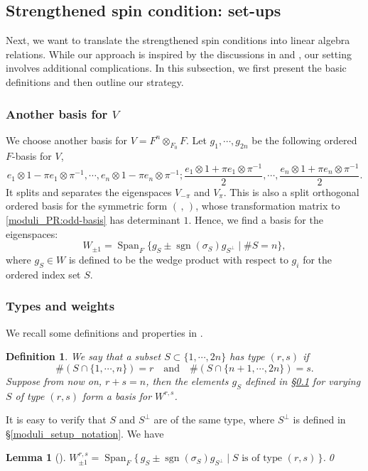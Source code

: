 \documentclass[pdflatex,sn-mathphys-num]{sn-jnl}%
\theoremstyle{thmstyleone}%
\newtheorem{lemma}[subsubsection]{Lemma}%
\theoremstyle{thmstyletwo}%
\numberwithin{equation}{subsection}
\theoremstyle{thmstylethree}%
\newtheorem{definition}[subsubsection]{Definition}%
\DeclareMathOperator{\sgn}{sgn}
\DeclareMathOperator{\Span}{Span}
\begin{document}
\subsection{Strengthened spin condition: set-ups}\label{equ_ss-setup}	
Next, we want to translate the strengthened spin conditions into linear algebra relations. 
While our approach is inspired by the discussions in \cite[\S 4.1]{Smithling2015} and \cite[\S 1.4.2]{Yu2019}, our setting involves additional complications. In this subsection, we first present the basic definitions and then outline our strategy.
		
\subsubsection{Another basis for $V$}
We choose another basis for $V=F^n\otimes_{F_0}F$. Let $g_1,\cdots,g_{2n}$ be the following ordered $F$-basis for $V$,
\begin{equation}
	e_1\otimes 1-\pi e_1\otimes \pi^{-1},\cdots,e_n\otimes 1-\pi e_n\otimes \pi^{-1};\frac{e_1\otimes 1+\pi e_1\otimes \pi^{-1}}{2},\cdots,\frac{e_n\otimes 1+\pi e_n\otimes \pi^{-1}}{2}.	
\end{equation}
It splits and separates the eigenspaces $V_{-\pi}$ and $V_\pi$.
This is also a split orthogonal ordered basis for the symmetric form $(\,,\,)$, whose transformation matrix to \eqref{moduli_PR:odd-basis} has determinant $1$. 
Hence, we find a basis for the eigenspaces:
\begin{equation*}\label{equ_ss-setup:decomp}
	W_{\pm 1}=
	\Span_F\{g_S\pm \sgn(\sigma_S)g_{S^\perp}\mid \#S=n\},
\end{equation*}
where $g_S\in W$ is defined to be the wedge product with respect to $g_i$ for the ordered index set $S$.  
		
		
		
		
\subsubsection{Types and weights}
We recall some definitions and properties in \cite[\S 4.2, \S 4.3]{Smithling2015}.
		
\begin{definition} 
We say that a subset $S \subset \{1,\cdots,2n\}$ has \emph{type $(r,s)$} if
\[
\#(S\cap \{1,\cdots,n\}) = r
\quad\text{and}\quad
\#(S\cap\{n+1,\cdots,2n\}) = s.
\]
Suppose from now on, $r + s = n$, then the elements $g_S$ defined in \S \ref{equ_ss-setup} for varying $S$ of type $(r,s)$ form a basis for $W^{r,s}$.
\end{definition}
It is easy to verify that $S$ and $S^\perp$ are of the same type, where $S^{\perp}$ is defined in \S \ref{moduli_setup_notation}. We have
\begin{lemma}[]\label{equ_ss-setup:span}
	$W_{\pm 1}^{r,s} = \Span_F\{\, g_S \pm \sgn(\sigma_S) g_{S^\perp} \mid S \text{ is of type } (r,s)\,\}$.\qed
\end{lemma}
		
\end{document}
